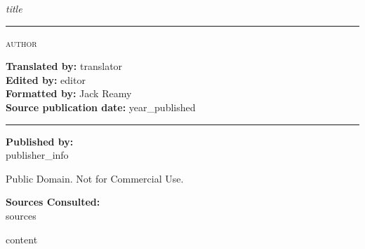 \documentclass[a5paper]{book}
\begin{document}
\begin{titlepage}
    \centering
    \vspace*{\fill}
    
    {\Huge\itshape {{title}}} \\[0.8cm]
    
    \vspace{2cm}
    \rule{4cm}{0.4pt} %
    \vspace{2cm}
    
    {\LARGE\scshape {{author}}}
    
    \vfill
\end{titlepage}

\clearpage
\thispagestyle{empty} %

\vspace*{\fill} %

{
\small
\setlength{\parskip}{0.5em}

\textbf{Translated by:} {{translator}} \\
\textbf{Edited by:} {{editor}} \\
\textbf{Formatted by:} Jack Reamy \\
\textbf{Source publication date:} {{year_published}}

\vspace{1em}
\rule{3cm}{0.4pt} %
\vspace{1em}

\textbf{Published by:} \\
{{publisher_info}} \\
\the\year

\vspace{0.8em}

Public Domain. Not for Commercial Use.

\textbf{Sources Consulted:} \\
{{sources}}

}

\tableofcontents
\newpage

{{content}}
\end{document}
